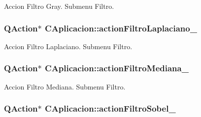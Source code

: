 Accion Filtro Gray. Submenu Filtro. 

\subsubsection[{\texorpdfstring{action\+Filtro\+Laplaciano\+\_\+}{actionFiltroLaplaciano_}}]{\setlength{\rightskip}{0pt plus 5cm}Q\+Action$\ast$ C\+Aplicacion\+::action\+Filtro\+Laplaciano\+\_\+\hspace{0.3cm}{\ttfamily [private]}}\hypertarget{classCAplicacion_ad1cce3c330ee913f1129d19bba5f22f0}{}\label{classCAplicacion_ad1cce3c330ee913f1129d19bba5f22f0}


Accion Filtro Laplaciano. Submenu Filtro. 

\subsubsection[{\texorpdfstring{action\+Filtro\+Mediana\+\_\+}{actionFiltroMediana_}}]{\setlength{\rightskip}{0pt plus 5cm}Q\+Action$\ast$ C\+Aplicacion\+::action\+Filtro\+Mediana\+\_\+\hspace{0.3cm}{\ttfamily [private]}}\hypertarget{classCAplicacion_a7121918f17fc9640c91f26961f7ee221}{}\label{classCAplicacion_a7121918f17fc9640c91f26961f7ee221}


Accion Filtro Mediana. Submenu Filtro. 

\subsubsection[{\texorpdfstring{action\+Filtro\+Sobel\+\_\+}{actionFiltroSobel_}}]{\setlength{\rightskip}{0pt plus 5cm}Q\+Action$\ast$ C\+Aplicacion\+::action\+Filtro\+Sobel\+\_\+\hspace{0.3cm}{\ttfamily [private]}}\hypertarget{classCAplicacion_a96511c94f6a4a6da0466d460272f56bf}{}\label{classCAplicacion_a96511c94f6a4a6da0466d460272f56bf}


